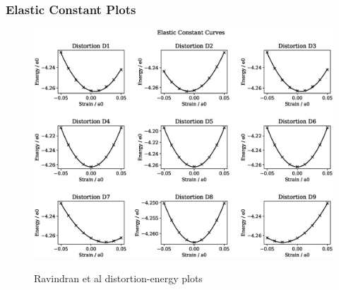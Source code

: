 \clearpage
\subsubsection{Elastic Constant Plots}

\begin{figure}[htb]
\centering
\includegraphics[width=.90\linewidth]{chapters/potentials_fe_pd_ru/fepd_potential/elastic_strains_bp_1.eps}  
\label{fig:fepd-fefcc-rose}
\caption{Ravindran et al\cite{dfttisiravindran} distortion-energy plots}
\end{figure}

